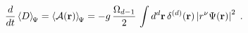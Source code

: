 \begin{equation}
\frac{d}{dt}
\left\langle
D
\right\rangle_{\scriptstyle \!  \Psi}
=
\left\langle
{\mathcal A} ({\bf r})
\right\rangle_{\scriptstyle \!  \Psi}
=
- g \, 
\frac{ \Omega_{d-1}}{2}
\,
\int
d^{d} {\bf r}
\,
\delta^{(d)} ({\bf r})
\left| r^{\nu} \Psi ({\bf r})
\right|^{2}
\;   .
\label{eq:time_rate_of_dilation_op_ddim-EV_2D_ISP}
\end{equation}


